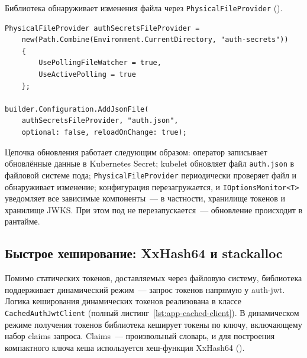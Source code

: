 Библиотека обнаруживает изменения файла
через \texttt{PhysicalFileProvider}
().

\begin{lstlisting}[language={[Sharp]C}]
PhysicalFileProvider authSecretsFileProvider =
    new(Path.Combine(Environment.CurrentDirectory, "auth-secrets"))
    {
        UsePollingFileWatcher = true,
        UseActivePolling = true
    };

builder.Configuration.AddJsonFile(
    authSecretsFileProvider, "auth.json",
    optional: false, reloadOnChange: true);
\end{lstlisting}

Цепочка обновления работает следующим образом:
оператор записывает обновлённые данные в Kubernetes Secret;
kubelet обновляет файл \texttt{auth.json} в файловой системе пода;
\texttt{PhysicalFileProvider} периодически проверяет файл и обнаруживает изменение;
конфигурация перезагружается, и \texttt{IOptionsMonitor<T>}
уведомляет все зависимые компоненты~---
в частности, хранилище токенов и хранилище JWKS.
При этом под не перезапускается~---
обновление происходит в рантайме.

\subsection{Быстрое хеширование: XxHash64 и stackalloc}\label{subsec:xxhash}

Помимо статических токенов, доставляемых через файловую систему,
библиотека поддерживает динамический режим~---
запрос токенов напрямую у auth-jwt.
Логика кеширования динамических токенов реализована
в классе \texttt{CachedAuthJwtClient}
(полный листинг~\ref{lst:app-cached-client}).
В динамическом режиме получения токенов
библиотека кеширует токены по ключу,
включающему набор claims запроса.
Claims~--- произвольный словарь,
и для построения компактного ключа кеша
используется хеш-функция XxHash64
().

